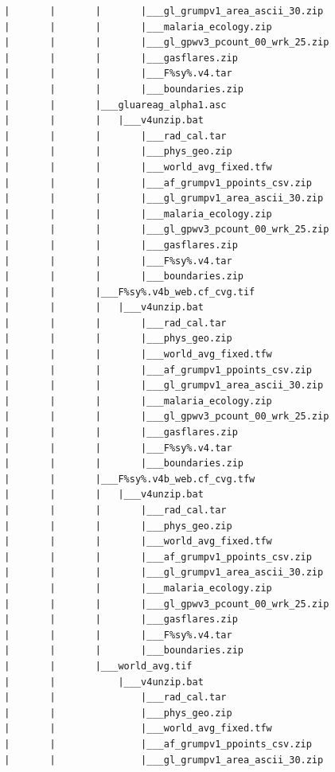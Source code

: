 \documentclass[]{book}
\begin{document}
\begin{verbatim}
        |       |       |       |___gl_grumpv1_area_ascii_30.zip
        |       |       |       |___malaria_ecology.zip
        |       |       |       |___gl_gpwv3_pcount_00_wrk_25.zip
        |       |       |       |___gasflares.zip
        |       |       |       |___F%sy%.v4.tar
        |       |       |       |___boundaries.zip
        |       |       |___gluareag_alpha1.asc
        |       |       |   |___v4unzip.bat
        |       |       |       |___rad_cal.tar
        |       |       |       |___phys_geo.zip
        |       |       |       |___world_avg_fixed.tfw
        |       |       |       |___af_grumpv1_ppoints_csv.zip
        |       |       |       |___gl_grumpv1_area_ascii_30.zip
        |       |       |       |___malaria_ecology.zip
        |       |       |       |___gl_gpwv3_pcount_00_wrk_25.zip
        |       |       |       |___gasflares.zip
        |       |       |       |___F%sy%.v4.tar
        |       |       |       |___boundaries.zip
        |       |       |___F%sy%.v4b_web.cf_cvg.tif
        |       |       |   |___v4unzip.bat
        |       |       |       |___rad_cal.tar
        |       |       |       |___phys_geo.zip
        |       |       |       |___world_avg_fixed.tfw
        |       |       |       |___af_grumpv1_ppoints_csv.zip
        |       |       |       |___gl_grumpv1_area_ascii_30.zip
        |       |       |       |___malaria_ecology.zip
        |       |       |       |___gl_gpwv3_pcount_00_wrk_25.zip
        |       |       |       |___gasflares.zip
        |       |       |       |___F%sy%.v4.tar
        |       |       |       |___boundaries.zip
        |       |       |___F%sy%.v4b_web.cf_cvg.tfw
        |       |       |   |___v4unzip.bat
        |       |       |       |___rad_cal.tar
        |       |       |       |___phys_geo.zip
        |       |       |       |___world_avg_fixed.tfw
        |       |       |       |___af_grumpv1_ppoints_csv.zip
        |       |       |       |___gl_grumpv1_area_ascii_30.zip
        |       |       |       |___malaria_ecology.zip
        |       |       |       |___gl_gpwv3_pcount_00_wrk_25.zip
        |       |       |       |___gasflares.zip
        |       |       |       |___F%sy%.v4.tar
        |       |       |       |___boundaries.zip
        |       |       |___world_avg.tif
        |       |           |___v4unzip.bat
        |       |               |___rad_cal.tar
        |       |               |___phys_geo.zip
        |       |               |___world_avg_fixed.tfw
        |       |               |___af_grumpv1_ppoints_csv.zip
        |       |               |___gl_grumpv1_area_ascii_30.zip

\end{verbatim}
\end{document}
